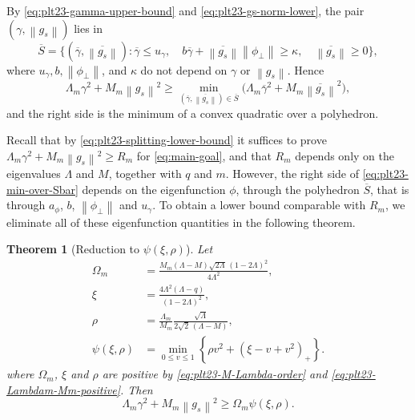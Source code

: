\documentclass[11pt]{article}
\newtheorem{theorem}{Theorem}[section]
\numberwithin{equation}{section}
\newcommand{\norm}[1]{\left\lVert #1\right\rVert}
\newcommand{\pos}[1]{\left(#1\right)_{+}}
\begin{document}
By \eqref{eq:plt23-gamma-upper-bound} and \eqref{eq:plt23-gs-norm-lower}, the pair $(\gamma,\norm{g_s})$ lies in
\begin{equation}\label{eq:plt23-Sbar}
  \overline S=\bigl\{(\overline\gamma,\overline{\norm{g_s}}):
  \overline\gamma\le u_\gamma,\quad
  b\overline\gamma+\overline{\norm{g_s}}\norm{\phi_\perp}\ge\kappa,\quad
  \overline{\norm{g_s}}\ge0\bigr\},
\end{equation}
where $u_\gamma, b, \norm{\phi_\perp}$, and $\kappa$ do not depend on $\gamma$ or $\norm{g_s}$.
Hence
\begin{equation}\label{eq:plt23-min-over-Sbar}
  \Lambda_m\gamma^2+M_m\norm{g_s}^2
  \ge\min_{(\overline\gamma,\overline{\norm{g_s}})\in\overline S}
  \bigl(\Lambda_m\overline\gamma^2+M_m\overline{\norm{g_s}}^2\bigr),
\end{equation}
and the right side is the minimum of a convex quadratic over a polyhedron.

Recall that by \eqref{eq:plt23-splitting-lower-bound} it suffices to prove $\Lambda_m\gamma^2+M_m\norm{g_s}^2\ge R_m$ for \eqref{eq:main-goal}, and that $R_m$ depends only on the eigenvalues $\Lambda$ and $M$, together with $q$ and $m$.
However, the right side of \eqref{eq:plt23-min-over-Sbar} depends on the eigenfunction $\phi$, through the polyhedron $\overline S$, that is through $a_\phi$, $b$, $\norm{\phi_\perp}$ and $u_\gamma$.
To obtain a lower bound comparable with $R_m$, we eliminate all of these eigenfunction quantities in the following theorem.

\begin{theorem}[Reduction to $\psi(\xi,\rho)$]\label{thm:plt23-huber-elim}
  Let
  \begin{align}
    \Omega_m&=\frac{M_m(\Lambda-M)\sqrt{2\Lambda}\,(1-2\Lambda)^2}{4\Lambda^2},
    \label{eq:plt23-C-xi-rho}\\
    \xi&=\frac{4\Lambda^2(\Lambda-q)}{(1-2\Lambda)^2},
    \label{eq:plt23-xi-def}\\
    \rho&=\frac{\Lambda_m}{M_m}\frac{\sqrt\Lambda}{2\sqrt2\,(\Lambda-M)},
    \label{eq:plt23-rho-def}\\
    \psi(\xi,\rho)&=
    \min_{0\le v\le1}
    \left\{\rho v^2+\pos{\xi-v+v^2}\right\}.
    \label{eq:plt23-psi-def}
  \end{align}
  where $\Omega_m$, $\xi$ and $\rho$ are positive by \eqref{eq:plt23-M-Lambda-order} and \eqref{eq:plt23-Lambdam-Mm-positive}.
  Then
  \begin{equation}\label{eq:plt23-huber-payment}
    \Lambda_m\gamma^2+M_m\norm{g_s}^2
    \ge \Omega_m\psi(\xi,\rho).
  \end{equation}
\end{theorem}
\end{document}
